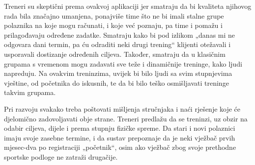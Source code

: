         {Treneri su skeptični prema ovakvoj aplikaciji jer smatraju da bi kvaliteta njihovog rada bila značajno umanjena, ponajviše time što ne bi imali stalne grupe polaznika na koje mogu računati, i koje već poznaju, pa time i pomažu i prilagođavaju određene zadatke. Smatraju kako bi pod izlikom „danas mi ne odgovara dani termin, pa ću odraditi neki drugi trening“ klijenti otežavali i usporavali dostizanje određenih ciljeva. Također, smatraju da u klasičnim grupama s vremenom mogu zadavati sve teže i dinamičnije treninge, kako ljudi napreduju. Na ovakvim treninzima, uvijek bi bilo ljudi sa svim stupnjevima vještine, od početnika do iskusnih, te da bi bilo teško osmišljavati treninge takvim grupama. \\}

        {Pri razvoju svakako treba poštovati mišljenja stručnjaka i naći rješenje koje će djelomično zadovoljavati obje strane. Treneri predlažu da se treninzi, uz obzir na odabir ciljeva, dijele i prema stupnju fizičke spreme. Da stari i novi polaznici imaju svoje zasebne termine, i da sustav prepoznaje da je neki vježbač prvih mjesec-dva po registraciji „početnik“, osim ako vježbač zbog svoje prethodne sportske podloge ne zatraži drugačije. \\}
            
		\eject

        